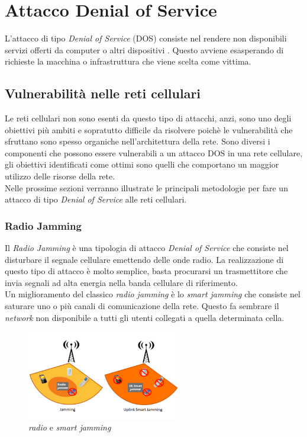 \chapter{Attacco Denial of Service}
L'attacco di tipo \textit{Denial of Service} (DOS) consiste nel rendere non disponibili servizi offerti da computer o altri
dispositivi \cite{dos-definition}. Questo avviene esasperando di richieste la macchina o infrastruttura che viene scelta come
vittima.

\section{Vulnerabilità nelle reti cellulari}
Le reti cellulari non sono esenti da questo tipo di attacchi, anzi, sono uno degli obiettivi più ambiti e sopratutto difficile da risolvere
poichè le vulnerabilità che sfruttano sono spesso organiche nell'architettura della rete.
Sono diversi i componenti che possono essere vulnerabili a un attacco DOS in una rete cellulare, gli obiettivi identificati come ottimi sono quelli
che comportano un maggior utilizzo delle risorse della rete.\\
Nelle prossime sezioni verranno illustrate le principali metodologie per fare un attacco di tipo \textit{Denial of Service} alle reti cellulari\cite{4g-dos-recap}.

\clearpage

\subsection{Radio Jamming}
Il \textit{Radio Jamming} è una tipologia di attacco \textit{Denial of Service} che consiste nel disturbare il segnale cellulare emettendo delle onde radio.
La realizzazione di questo tipo di attacco è molto semplice, basta procurarsi un trasmettitore che invia segnali ad alta energia nella banda cellulare di riferimento.\\
Un miglioramento del classico \textit{radio jamming} è lo \textit{smart jamming} che consiste nel saturare uno o più canali di comunicazione della rete. Questo fa sembrare 
il \textit{network} non disponibile a tutti gli utenti collegati a quella determinata cella.
\begin{figure}[h]
    \centering
    \includegraphics[width=0.6\textwidth]{images/dos-jamming.png}
    \caption{\textit{radio} e \textit{smart jamming}\cite{4g-dos-recap}}
\end{figure}\\

